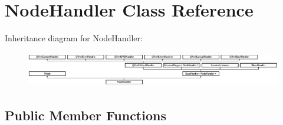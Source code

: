 \hypertarget{class_node_handler}{}\section{Node\+Handler Class Reference}
\label{class_node_handler}
Inheritance diagram for Node\+Handler\+:\begin{figure}[H]
\begin{center}
\leavevmode
\includegraphics[height=1.545894cm]{class_node_handler}
\end{center}
\end{figure}
\subsection*{Public Member Functions}
